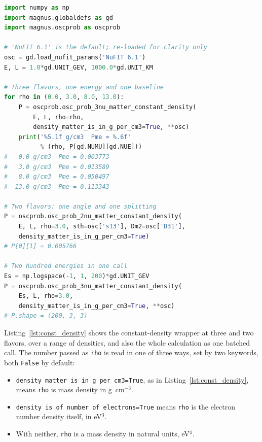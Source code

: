 \documentclass[final,5p,times,twocolumn,sort,compress]{elsarticle}
\makeatletter
\DeclareRobustCommand{\_}{%
  \ifmmode\nfss@text{\textunderscore}\else\textunderscore\allowbreak\fi}
\makeatother
\begin{document}
\begin{lstlisting}[language=Python, caption={\textbf{Constant density at three and two flavors.} The density is swept from vacuum to about the value at the center of the Earth. The last call returns 200 energies at one density, which the constant-Hamiltonian engine of Sec.~\ref{sec:engines} answers as a single stack of matrix exponentials. See Sec.~\ref{sec:constant_density} for details.}, label={lst:const_density}, float=tbp]
import numpy as np
import magnus.globaldefs as gd
import magnus.oscprob as oscprob

# 'NuFIT 6.1' is the default; re-loaded for clarity only
osc = gd.load_nufit_params('NuFIT 6.1')
E, L = 1.0*gd.UNIT_GEV, 1000.0*gd.UNIT_KM

# Three flavors, one energy and one baseline
for rho in (0.0, 3.0, 8.0, 13.0):
    P = oscprob.osc_prob_3nu_matter_constant_density(
        E, L, rho=rho,
        density_matter_is_in_g_per_cm3=True, **osc)
    print('%5.1f g/cm3  Pme = %.6f'
          % (rho, P[gd.NUMU][gd.NUE]))
#   0.0 g/cm3  Pme = 0.003773
#   3.0 g/cm3  Pme = 0.013589
#   8.0 g/cm3  Pme = 0.050497
#  13.0 g/cm3  Pme = 0.113343

# Two flavors: one angle and one splitting
P = oscprob.osc_prob_2nu_matter_constant_density(
    E, L, rho=3.0, sth=osc['s13'], Dm2=osc['D31'],
    density_matter_is_in_g_per_cm3=True)
# P[0][1] = 0.005766

# Two hundred energies in one call
Es = np.logspace(-1, 1, 200)*gd.UNIT_GEV
P = oscprob.osc_prob_3nu_matter_constant_density(
    Es, L, rho=3.0,
    density_matter_is_in_g_per_cm3=True, **osc)
# P.shape = (200, 3, 3)
\end{lstlisting}

Listing~\ref{lst:const_density} shows the constant-density wrapper at three and two flavors, over a range of densities, and also the whole calculation as one batched call. The number passed as {\tt rho} is read in one of three ways, set by two keywords, both {\tt False} by default:
\begin{itemize}
\item {\tt density\_matter\_is\_in\_g\_per\_cm3=True}, as in Listing~\ref{lst:const_density}, means {\tt rho} is mass density in g~cm$^{-3}$.
\item {\tt density\_is\_of\_number\_of\_electrons=True} means {\tt rho} is the electron number density itself, in eV$^3$.
\item With neither, {\tt rho} is a mass density in natural units, eV$^4$.
\end{itemize}
\end{document}
